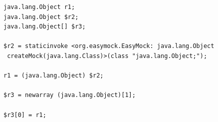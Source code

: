 \begin{lstlisting}[basicstyle=\ttfamily, caption={Jimple Intermediate Representation for the sample code in Figure~\ref{fig:arrayMockIllustration}.},
basicstyle=\scriptsize\ttfamily, framesep=4.5mm, framexleftmargin=1.0mm, captionpos=b, xleftmargin=3.5ex, label=lis:arrayIllustrationIR, escapechar=|]
java.lang.Object r1;
java.lang.Object $r2;
java.lang.Object[] $r3;

$r2 = staticinvoke <org.easymock.EasyMock: java.lang.Object
 createMock(java.lang.Class)>(class "java.lang.Object;");

r1 = (java.lang.Object) $r2;

$r3 = newarray (java.lang.Object)[1];

$r3[0] = r1;
\end{lstlisting}